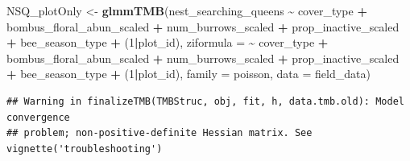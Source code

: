 \documentclass[
]{article}
\newenvironment{Shaded}{\begin{snugshade}}{\end{snugshade}}
\newcommand{\AttributeTok}[1]{\textcolor[rgb]{0.13,0.29,0.53}{#1}}
\newcommand{\DecValTok}[1]{\textcolor[rgb]{0.00,0.00,0.81}{#1}}
\newcommand{\FunctionTok}[1]{\textcolor[rgb]{0.13,0.29,0.53}{\textbf{#1}}}
\newcommand{\NormalTok}[1]{#1}
\newcommand{\OtherTok}[1]{\textcolor[rgb]{0.56,0.35,0.01}{#1}}
\newcommand{\SpecialCharTok}[1]{\textcolor[rgb]{0.81,0.36,0.00}{\textbf{#1}}}
\begin{document}
\begin{Shaded}
\begin{Highlighting}[]
\NormalTok{NSQ\_plotOnly }\OtherTok{\textless{}{-}}  \FunctionTok{glmmTMB}\NormalTok{(nest\_searching\_queens }\SpecialCharTok{\textasciitilde{}}\NormalTok{ cover\_type }\SpecialCharTok{+} 
\NormalTok{                        bombus\_floral\_abun\_scaled }\SpecialCharTok{+} 
\NormalTok{                        num\_burrows\_scaled }\SpecialCharTok{+} 
\NormalTok{                        prop\_inactive\_scaled }\SpecialCharTok{+}
\NormalTok{                        bee\_season\_type }\SpecialCharTok{+} 
\NormalTok{                        (}\DecValTok{1}\SpecialCharTok{|}\NormalTok{plot\_id),}
                      \AttributeTok{ziformula =} \SpecialCharTok{\textasciitilde{}}\NormalTok{ cover\_type }\SpecialCharTok{+} 
\NormalTok{                        bombus\_floral\_abun\_scaled }\SpecialCharTok{+} 
\NormalTok{                        num\_burrows\_scaled }\SpecialCharTok{+} 
\NormalTok{                        prop\_inactive\_scaled }\SpecialCharTok{+}
\NormalTok{                        bee\_season\_type }\SpecialCharTok{+}
\NormalTok{                        (}\DecValTok{1}\SpecialCharTok{|}\NormalTok{plot\_id),}
                      \AttributeTok{family =}\NormalTok{ poisson, }
                      \AttributeTok{data =}\NormalTok{ field\_data)}
\end{Highlighting}
\end{Shaded}

\begin{verbatim}
## Warning in finalizeTMB(TMBStruc, obj, fit, h, data.tmb.old): Model convergence
## problem; non-positive-definite Hessian matrix. See vignette('troubleshooting')
\end{verbatim}
\end{document}
